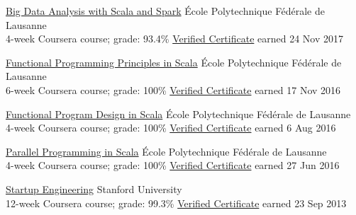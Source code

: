 \newcommand\mynewskip{-3mm}
\href{https://www.coursera.org/learn/scala-spark-big-data/home/welcome}{Big Data Analysis with Scala and Spark}
\hfill \'{E}cole Polytechnique F\'{e}d\'{e}rale de Lausanne\\
    {\small 4-week Coursera course; grade: 93.4\%} \hfill
\href{https://www.coursera.org/account/accomplishments/records/93DVEX3QH86L}{Verified
      Certificate} earned 24 Nov 2017

    \vspace\mynewskip
\href{https://www.coursera.org/learn/progfun1/home}{Functional Programming Principles in Scala}
    \hfill \'{E}cole Polytechnique F\'{e}d\'{e}rale de Lausanne\\
    {\small 6-week Coursera course; grade: 100\%} \hfill
    \href{https://www.coursera.org/account/accomplishments/records/CKWD8PLCPW4E}{Verified
      Certificate} earned 17 Nov 2016

    \vspace\mynewskip
    \href{https://www.coursera.org/learn/progfun2/home}{Functional Program Design in Scala}
    \hfill \'{E}cole Polytechnique F\'{e}d\'{e}rale de Lausanne\\
    {\small 4-week Coursera course; grade: 100\%} \hfill
    \href{https://www.coursera.org/account/accomplishments/records/2WE2UZSR5AAZ}{Verified
      Certificate} earned 6 Aug 2016

    \vspace\mynewskip
    \href{https://www.coursera.org/learn/parprog1}{Parallel Programming in Scala} \hfill
    \'{E}cole Polytechnique F\'{e}d\'{e}rale de Lausanne\\
    {\small 4-week Coursera course; grade: 100\%} \hfill
    \hfill \href{https://www.coursera.org/account/accomplishments/records/3XV34H6BTTHC}{Verified Certificate} earned 27 Jun 2016
    
    \vspace\mynewskip
    \href{https://www.coursera.org/course/startup}{Startup Engineering} \hfill Stanford University\\
    {\small 12-week Coursera course; grade: 99.3\%}     \hfill
    \href{https://www.coursera.org/maestro/api/certificate/get_certificate?course_id=970374}{Verified Certificate}
    earned 23 Sep 2013
